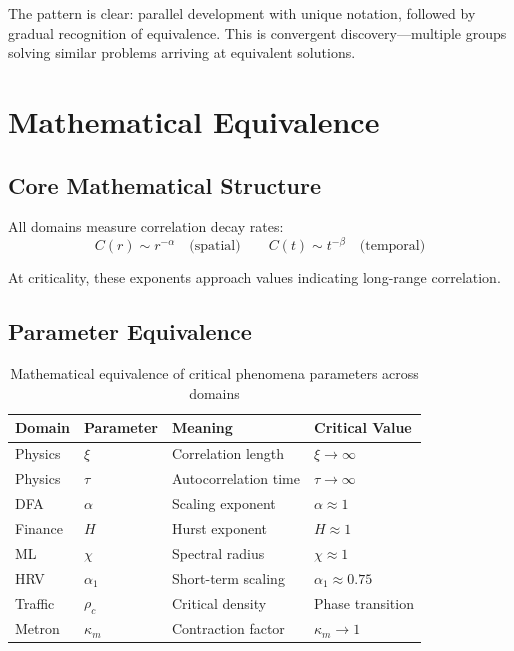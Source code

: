 \documentclass[11pt]{article}
\begin{document}
The pattern is clear: parallel development with unique notation, followed by gradual recognition of equivalence. This is convergent discovery---multiple groups solving similar problems arriving at equivalent solutions.

\section{Mathematical Equivalence}

\subsection{Core Mathematical Structure}

All domains measure correlation decay rates:
\begin{equation}
C(r) \sim r^{-\alpha} \quad \text{(spatial)} \qquad C(t) \sim t^{-\beta} \quad \text{(temporal)}
\end{equation}

At criticality, these exponents approach values indicating long-range correlation.

\subsection{Parameter Equivalence}

\begin{table}[h]
\centering
\caption{Mathematical equivalence of critical phenomena parameters across domains}
\label{tab:equiv}
\begin{tabular}{llll}
\toprule
\textbf{Domain} & \textbf{Parameter} & \textbf{Meaning} & \textbf{Critical Value} \\
\midrule
Physics & $\xi$ & Correlation length & $\xi \to \infty$ \\
Physics & $\tau$ & Autocorrelation time & $\tau \to \infty$ \\
DFA & $\alpha$ & Scaling exponent & $\alpha \approx 1$ \\
Finance & $H$ & Hurst exponent & $H \approx 1$ \\
ML & $\chi$ & Spectral radius & $\chi \approx 1$ \\
HRV & $\alpha_1$ & Short-term scaling & $\alpha_1 \approx 0.75$ \\
Traffic & $\rho_c$ & Critical density & Phase transition \\
Metron & $\kappa_m$ & Contraction factor & $\kappa_m \to 1$ \\
\bottomrule
\end{tabular}
\end{table}
\end{document}
